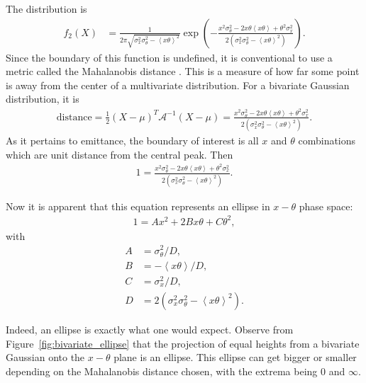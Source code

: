 The distribution is
\begin{align*}
f_2(X)&=\frac{1}{2\pi\sqrt{\sigma_x^2\sigma_\theta^2-\left<x\theta\right>^2}}\exp\left(-\frac{x^2\sigma_\theta^2-2x\theta\left<x\theta\right>+\theta^2\sigma_x^2}{2(\sigma_x^2\sigma_\theta^2-\left<x\theta\right>^2)}\right).
\end{align*}
Since the boundary of this function is undefined, it is conventional to use a metric called the Mahalanobis distance \cite{mahalanobis}. This is a measure of how far some point is away from the center of a multivariate distribution. For a bivariate Gaussian distribution, it is
\begin{align*}
\text{distance}=\frac{1}{2}(X-\mu)^T\mathcal{A}^{-1}(X-\mu)=\frac{x^2\sigma_\theta^2-2x\theta\left<x\theta\right>+\theta^2\sigma_x^2}{2(\sigma_x^2\sigma_\theta^2-\left<x\theta\right>^2)}.
\end{align*} 
As it pertains to emittance, the boundary of interest is all $x$ and $\theta$ combinations which are unit distance from the central peak. Then
\begin{align*}
1=\frac{x^2\sigma_\theta^2-2x\theta\left<x\theta\right>+\theta^2\sigma_x^2}{2(\sigma_x^2\sigma_\theta^2-\left<x\theta\right>^2)}.
\end{align*}

Now it is apparent that this equation represents an ellipse in $x-\theta$ phase space:
\begin{align} \label{eqn:ellipse}
1=Ax^2+2Bx\theta+C\theta^2,
\end{align}
with
\begin{align*}
A&=\sigma_\theta^2/D,\\
B&=-\left<x\theta\right>/D,\\
C&=\sigma_x^2/D,\\
D&=2(\sigma_x ^2 \sigma_\theta^2 - \left<x\theta\right>^2).
\end{align*}

Indeed, an ellipse is exactly what one would expect. Observe from Figure~\ref{fig:bivariate_ellipse} that the projection of equal heights from a bivariate Gaussian onto the $x-\theta$ plane is an ellipse. This ellipse can get bigger or smaller depending on the Mahalanobis distance chosen, with the extrema being 0 and $\infty$.

